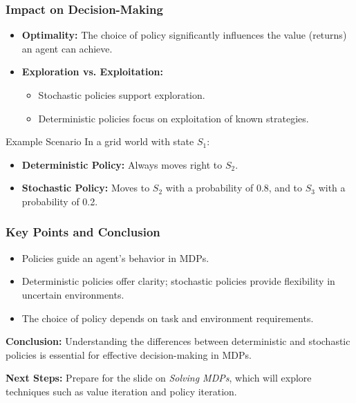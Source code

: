 \documentclass[aspectratio=169]{beamer}
\begin{document}
\begin{frame}[fragile]
    \frametitle{Impact on Decision-Making}
    \begin{itemize}
        \item \textbf{Optimality:} The choice of policy significantly influences the value (returns) an agent can achieve.
        \item \textbf{Exploration vs. Exploitation:}
        \begin{itemize}
            \item Stochastic policies support exploration.
            \item Deterministic policies focus on exploitation of known strategies.
        \end{itemize}
    \end{itemize}
    
    \begin{block}{Example Scenario}
        In a grid world with state \( S_1 \):
        \begin{itemize}
            \item \textbf{Deterministic Policy:} Always moves right to \( S_2 \).
            \item \textbf{Stochastic Policy:} Moves to \( S_2 \) with a probability of 0.8, and to \( S_3 \) with a probability of 0.2.
        \end{itemize}
    \end{block}
\end{frame}

\begin{frame}[fragile]
    \frametitle{Key Points and Conclusion}
    \begin{itemize}
        \item Policies guide an agent's behavior in MDPs.
        \item Deterministic policies offer clarity; stochastic policies provide flexibility in uncertain environments.
        \item The choice of policy depends on task and environment requirements.
    \end{itemize}
    
    \textbf{Conclusion:} Understanding the differences between deterministic and stochastic policies is essential for effective decision-making in MDPs.

    \textbf{Next Steps:} Prepare for the slide on \textit{Solving MDPs}, which will explore techniques such as value iteration and policy iteration.
\end{frame}
\end{document}
